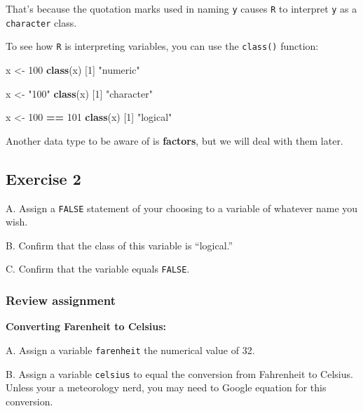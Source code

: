 \documentclass[
]{book}
\newenvironment{Shaded}{\begin{snugshade}}{\end{snugshade}}
\newcommand{\DecValTok}[1]{\textcolor[rgb]{0.00,0.00,0.81}{#1}}
\newcommand{\KeywordTok}[1]{\textcolor[rgb]{0.13,0.29,0.53}{\textbf{#1}}}
\newcommand{\NormalTok}[1]{#1}
\newcommand{\OperatorTok}[1]{\textcolor[rgb]{0.81,0.36,0.00}{\textbf{#1}}}
\newcommand{\StringTok}[1]{\textcolor[rgb]{0.31,0.60,0.02}{#1}}
\begin{document}
That's because the quotation marks used in naming \texttt{y} causes \texttt{R} to interpret \texttt{y} as a \texttt{character} class.

To see how \texttt{R} is interpreting variables, you can use the \texttt{class()} function:

\begin{Shaded}
\begin{Highlighting}[]
\NormalTok{x <-}\StringTok{ }\DecValTok{100}
\KeywordTok{class}\NormalTok{(x)}
\NormalTok{[}\DecValTok{1}\NormalTok{] }\StringTok{"numeric"}

\NormalTok{x <-}\StringTok{ "100"}
\KeywordTok{class}\NormalTok{(x)}
\NormalTok{[}\DecValTok{1}\NormalTok{] }\StringTok{"character"}

\NormalTok{x <-}\StringTok{ }\DecValTok{100} \OperatorTok{==}\StringTok{ }\DecValTok{101}
\KeywordTok{class}\NormalTok{(x)}
\NormalTok{[}\DecValTok{1}\NormalTok{] }\StringTok{"logical"}
\end{Highlighting}
\end{Shaded}

Another data type to be aware of is \textbf{factors}, but we will deal with them later.

\hypertarget{exercise-2-1}{%
\subsection*{Exercise 2}\label{exercise-2-1}}

A. Assign a \texttt{FALSE} statement of your choosing to a variable of whatever name you wish.

B. Confirm that the class of this variable is ``logical.''

C. Confirm that the variable equals \texttt{FALSE}.

\hypertarget{review-assignment-2}{%
\subsubsection*{Review assignment}\label{review-assignment-2}}

\textbf{Converting Farenheit to Celsius:}

A. Assign a variable \texttt{farenheit} the numerical value of 32.

B. Assign a variable \texttt{celsius} to equal the conversion from Fahrenheit to Celsius. Unless your a meteorology nerd, you may need to Google equation for this conversion.
\end{document}
